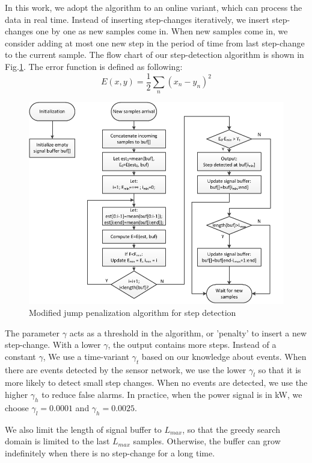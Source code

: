 In this work, we adopt the algorithm to an online variant, which can process the data in real time.  Instead of inserting step-changes iteratively, we insert step-changes one by one as new samples come in. When new samples come in, we consider adding at most one new step in the period of time from last step-change to the current sample. The flow chart of our step-detection algorithm is shown in Fig.\ref{fig:pwc}. The error function is defined as following: \[E(x,y) = \frac{1}{2} \sum_n \left(x_n - y_n\right)^2\]

\begin{figure}[htb]
  \centering
  \includegraphics[width=\textwidth]{figures/pwc}
  \caption{Modified jump penalization algorithm for step detection}
  \label{fig:pwc}
\end{figure}

The parameter $\gamma$ acts as a threshold in the algorithm, or 'penalty' to insert a new step-change. With a lower $\gamma$, the output contains more steps. Instead of a constant $\gamma$, We use a time-variant $\gamma_t$ based on our knowledge about events. When there are events detected by the sensor network, we use the lower $\gamma_l$ so that it is more likely to detect small step changes. When no events are detected, we use the higher $\gamma_h$ to reduce false alarms. In practice, when the power signal is in kW, we choose $\gamma_l = 0.0001$ and $\gamma_h=0.0025$. 

We also limit the length of signal buffer to $L_{max}$, so that the greedy search domain is limited to the last $L_{max}$ samples. Otherwise, the buffer can grow indefinitely when there is no step-change for a long time. 

